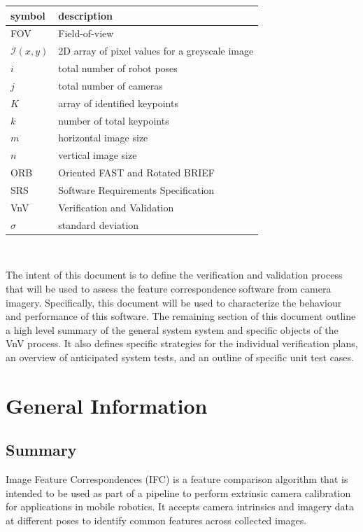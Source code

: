 \documentclass[12pt, titlepage]{article}
\begin{document}
\renewcommand{\arraystretch}{1.2}
\begin{tabular}{l l} 
  \toprule		
  \textbf{symbol} & \textbf{description}\\
  \midrule
  FOV & Field-of-view\\
  $\mathcal{I}(x,y)$ & 2D array of pixel values for a greyscale image \\
  $i$ & total number of robot poses\\
  $j$ & total number of cameras\\
  $K$ & array of identified keypoints\\
  $k$ & number of total keypoints\\
  $m$ & horizontal image size\\
  $n$ & vertical image size\\
  ORB & Oriented FAST and Rotated BRIEF\\
  SRS & Software Requirements Specification\\
  VnV & Verification and Validation\\
  $\sigma$ & standard deviation\\
  \bottomrule
\end{tabular}\\

\newpage


The intent of this document is to define the verification and validation process 
that will be used to assess the feature correspondence software from camera 
imagery. Specifically, this document will be used to characterize the behaviour and 
performance of this software. The remaining section of this document outline a high 
level summary of the general system system and specific objects of the VnV process. 
It also defines specific strategies for the individual verification plans, an overview of 
anticipated system tests, and an outline of specific unit test cases.

\section{General Information}

\subsection{Summary}
Image Feature Correspondences (IFC) is a feature comparison algorithm that is intended 
to be used as part of a pipeline to perform extrinsic camera calibration for 
applications in mobile robotics. It accepts camera intrinsics and imagery data at different 
poses to identify common features across collected images. 
\end{document}
